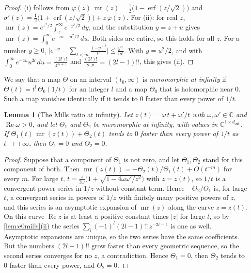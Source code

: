 \documentclass[10pt]{article}
\newtheorem{lemma}[theorem]{Lemma}
\theoremstyle{definition}
\theoremstyle{remark}
\DeclareRobustCommand{\cpref}[2]{\hyperref[#1:#2]{\cref*{#1}(#2)}}
\begin{document}
\begin{proof}
(i) follows from $\varphi(z)\,\operatorname{mr}(z) = \frac12\big(1 - \operatorname{erf}(z/\sqrt2)\big)$ and $\sigma'(z) = \frac12\big(1 + \operatorname{erf}(z/\sqrt2)\big) + z\,\varphi(z)$. For (ii): for real $z$, $\operatorname{mr}(z) = e^{z^2/2}\int_z^\infty e^{-y^2/2}\,dy$, and the substitution $y = z + u$ gives $\operatorname{mr}(z) = \int_0^\infty e^{-zu - u^2/2}\,du$. Both sides are entire, so this holds for all $z$. For a number $y \ge 0$, $\big\lvert e^{-y} - \sum_{l<m}\frac{(-y)^l}{l!}\big\rvert \le \frac{y^m}{m!}$. With $y = u^2/2$, and with $\int_0^\infty e^{-zu}u^{2l}\,du = \frac{(2l)!}{z^{2l+1}}$ and $\frac{(2l)!}{2^l\,l!} = (2l-1)!!$, this gives (ii).
\end{proof}

We say that a map $\Theta$ on an interval $(t_0, \infty)$ is \emph{meromorphic at infinity} if $\Theta(t) = t^{l}\,\Theta_0(1/t)$ for an integer $l$ and a map $\Theta_0$ that is holomorphic near $0$. Such a map vanishes identically if it tends to $0$ faster than every power of $1/t$.

\begin{lemma}[The Mills ratio at infinity]\label{lem:e0nomero}
Let $z(t) = \omega\,t + \omega'/t$ with $\omega, \omega' \in \mathbb C$ and $\operatorname{Re}\omega > 0$, and let $\Theta_1$ and $\Theta_2$ be meromorphic at infinity, with values in $\mathbb C^{1\times d_{\mathrm{out}}}$. If $\Theta_1(t)\,\operatorname{mr}(z(t)) + \Theta_2(t)$ tends to $0$ faster than every power of $1/t$ as $t \to +\infty$, then $\Theta_1 = 0$ and $\Theta_2 = 0$.
\end{lemma}

\begin{proof}
Suppose that a component of $\Theta_1$ is not zero, and let $\Theta_1, \Theta_2$ stand for this component of both. Then $\operatorname{mr}(z(t)) = -\Theta_2(t)/\Theta_1(t) + O(t^{-m})$ for every $m$. For large $t$, $t = \frac{z}{2\omega}\big(1 + \sqrt{1 - 4\omega\omega'/z^2}\big)$ with $z = z(t)$, so $1/t$ is a convergent power series in $1/z$ without constant term. Hence $-\Theta_2/\Theta_1$ is, for large $t$, a convergent series in powers of $1/z$ with finitely many positive powers of $z$, and this series is an asymptotic expansion of $\operatorname{mr}(z)$ along the curve $z = z(t)$. On this curve $\operatorname{Re}z$ is at least a positive constant times $\lvert z\rvert$ for large $t$, so by \cpref{lem:e0mills}{ii} the series $\sum_l(-1)^l(2l-1)!!\,z^{-2l-1}$ is one as well. Asymptotic expansions are unique, so the two series have the same coefficients. But the numbers $(2l-1)!!$ grow faster than every geometric sequence, so the second series converges for no $z$, a contradiction. Hence $\Theta_1 = 0$, then $\Theta_2$ tends to $0$ faster than every power, and $\Theta_2 = 0$.
\end{proof}
\end{document}
